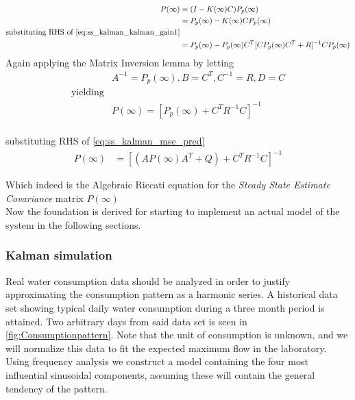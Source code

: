 \begin{equation}
	\begin{split}\label{eq:ss_kalman_udledning5}
	 	{P}(\infty) 	& = ({I} - {K}(\infty) {C}) {P}_p(\infty) \\ %
		& = {P}_p(\infty) - {K}(\infty) {C}{P}_p(\infty) \\
		\text{substituting RHS of \cref{eq:ss_kalman_kalman_gain1}} \\
		& = {P}_p(\infty) - {P}_p(\infty) {C}^T [{C} {P}_p	(\infty) {C}^T + {R}]^{-1}{C}{P}_p(\infty) \\
	\end{split}
\end{equation}
Again applying the Matrix Inversion lemma by letting
\begin{equation}
	\begin{split}\label{eq:ss_kalman_udledning5}
		&{A}^{-1} = {P}_p(\infty), {B} = {C}^T, {C}^{-1} = {R}, {D} = {C} \\
		\text{yielding} \\
		&{P}(\infty) = [{P}_p(\infty) + {C}^T{R}^{-1}{C}]^{-1} \\ 
	\end{split}
\end{equation}     

substituting RHS of \cref{eq:ss_kalman_mse_pred}
\begin{align}
		{P}(\infty) & = [({A}{P}(\infty){A}^T + {Q}) + {C}^T{R}^{-1}{C}]^{-1}  \label{eq:ss_kalman_udledning6}
\end{align}

Which indeed is the Algebraic Riccati equation for the \textit{Steady State Estimate Covariance} matrix ${P}(\infty)$\\
Now the foundation is derived for starting to implement an actual model of the system in the following sections.

\subsubsection{Kalman simulation}\label{sec:kalman_imp}
Real water consumption data should be analyzed in order to justify approximating the consumption pattern as a harmonic series. A historical data set showing typical daily water consumption during a three month period is attained. Two arbitrary days from said data set is seen in \cref{fig:Consumptionpattern}. Note that the unit of consumption is unknown, and we will normalize this data to fit the expected maximum flow in the laboratory.  Using frequency analysis we construct a model containing the four most influential sinusoidal components, assuming these will contain the general tendency of the pattern.

